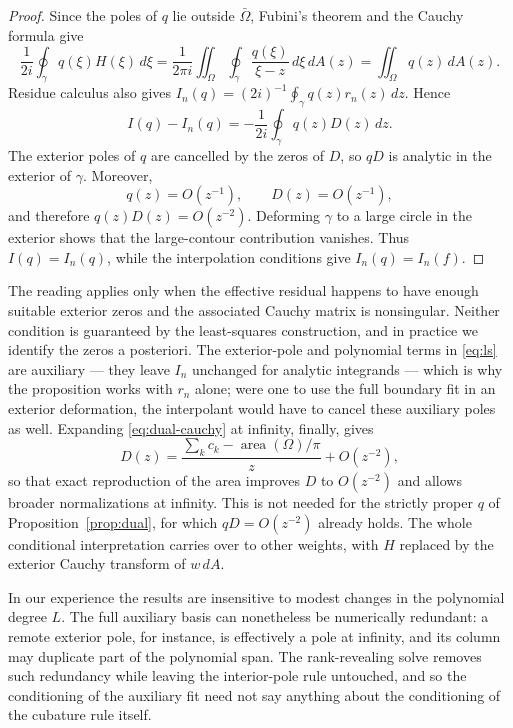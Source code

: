 \documentclass[onefignum,onetabnum]{siamart220329}
\newcommand{\dA}{\,dA}
\begin{document}
\begin{proof}
Since the poles of $q$ lie outside $\bar\Omega$, Fubini's theorem and
the Cauchy formula give
\[
\frac{1}{2i}\oint_\gamma q(\xi)H(\xi)\,d\xi
 =\frac{1}{2\pi i}\iint_\Omega
   \oint_\gamma \frac{q(\xi)}{\xi-z}\,d\xi\,dA(z)
 =\iint_\Omega q(z)\,dA(z).
\]
Residue calculus also gives
$I_n(q)=(2i)^{-1}\oint_\gamma q(z)r_n(z)\,dz$. Hence
\[
I(q)-I_n(q)
  =-\frac{1}{2i}\oint_\gamma q(z)D(z)\,dz.
\]
The exterior poles of $q$ are cancelled by the zeros of $D$, so $qD$
is analytic in the exterior of $\gamma$. Moreover,
\[
  q(z)=O(z^{-1}),\qquad D(z)=O(z^{-1}),
\]
and therefore $q(z)D(z)=O(z^{-2})$. Deforming $\gamma$ to a large
circle in the exterior shows that the large-contour contribution
vanishes. Thus
$I(q)=I_n(q)$, while the interpolation conditions give
$I_n(q)=I_n(f)$.
\end{proof}

The reading applies only when the effective residual happens to have
enough suitable exterior zeros and the associated Cauchy matrix is
nonsingular. Neither condition is guaranteed by the least-squares
construction, and in practice we identify the zeros a posteriori. The
exterior-pole and polynomial terms in \eqref{eq:ls} are auxiliary ---
they leave $I_n$ unchanged for analytic integrands --- which is why the
proposition works with $r_n$ alone; were one to use the full boundary
fit in an exterior deformation, the interpolant would have to cancel
these auxiliary poles as well. Expanding \eqref{eq:dual-cauchy} at
infinity, finally, gives
\[
   D(z)=\frac{\sum_k c_k-\operatorname{area}(\Omega)/\pi}{z}
        +O(z^{-2}),
\]
so that exact reproduction of the area improves $D$ to $O(z^{-2})$ and
allows broader normalizations at infinity. This is not needed for the
strictly proper $q$ of Proposition~\ref{prop:dual}, for which
$qD=O(z^{-2})$ already holds. The whole conditional interpretation
carries over to other weights, with $H$ replaced by the exterior Cauchy
transform of $w\dA$.

In our experience the results are insensitive to modest changes in the
polynomial degree $L$. The full auxiliary basis can nonetheless be
numerically redundant: a remote exterior pole, for instance, is
effectively a pole at infinity, and its column may duplicate part of
the polynomial span. The rank-revealing solve removes such redundancy
while leaving the interior-pole rule untouched, and so the conditioning
of the auxiliary fit need not say anything about the conditioning of the
cubature rule itself.
\end{document}
